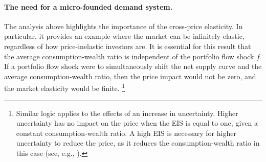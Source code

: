 




\paragraph{The need for a micro-founded demand system.} 
The analysis above highlights the importance of the cross-price elasticity.
In particular, it provides an example where the market can be infinitely elastic, regardless of how price-inelastic investors are. 
It is essential for this result that the average consumption-wealth ratio is independent of the portfolio flow shock $f$. 
If a portfolio flow shock were to simultaneously shift the net supply curve and the average consumption-wealth ratio, then the price impact would not be zero, and the market elasticity would be finite.
\footnote{
Similar logic applies to the effects of an increase in uncertainty. 
Higher uncertainty has no impact on the price when the EIS is equal to one, given a constant consumption-wealth ratio.  
A high EIS is necessary for higher uncertainty to reduce the price, as it reduces the consumption-wealth ratio in this case (see, e.g., \citealt{bansal2004risks}).
}

